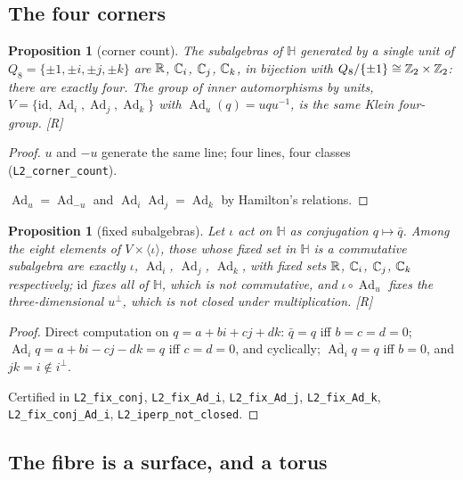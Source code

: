 \documentclass[11pt,a4paper]{article}
\theoremstyle{plain}
\newtheorem{proposition}[theorem]{Proposition}
\theoremstyle{definition}
\theoremstyle{remark}
\newcommand{\Hquat}{\mathbb{H}}
\newcommand{\Ad}{\operatorname{Ad}}
\newcommand{\rigR}{[\textup{R}]}
\begin{document}
\subsection{The four corners}

\begin{proposition}[corner count]\label{prop:corners}
The subalgebras of $\Hquat$ generated by a single unit of $Q_{8}=\{\pm1,\pm i,\pm j,\pm k\}$ are $\mathbb{R}$, $\mathbb{C}_{i}$, $\mathbb{C}_{j}$, $\mathbb{C}_{k}$, in bijection with $Q_{8}/\{\pm1\}\cong\mathbb{Z}_{2}\times\mathbb{Z}_{2}$: there are exactly four. The group of inner automorphisms by units, $V=\{\mathrm{id},\Ad_{i},\Ad_{j},\Ad_{k}\}$ with $\Ad_{u}(q)=uqu^{-1}$, is the same Klein four-group. \rigR
\end{proposition}

\begin{proof}
$u$ and $-u$ generate the same line; four lines, four classes (\texttt{L2\_corner\_count}).

$\Ad_{u}=\Ad_{-u}$ and $\Ad_{i}\Ad_{j}=\Ad_{k}$ by Hamilton's relations.
\end{proof}

\begin{proposition}[fixed subalgebras]\label{prop:fixed}
Let $\iota$ act on $\Hquat$ as conjugation $q\mapsto\bar q$. Among the eight elements of $V\times\langle\iota\rangle$, those whose fixed set in $\Hquat$ is a commutative subalgebra are exactly $\iota$, $\Ad_{i}$, $\Ad_{j}$, $\Ad_{k}$, with fixed sets $\mathbb{R}$, $\mathbb{C}_{i}$, $\mathbb{C}_{j}$, $\mathbb{C}_{k}$ respectively; $\mathrm{id}$ fixes all of $\Hquat$, which is not commutative, and $\iota\circ\Ad_{u}$ fixes the three-dimensional $u^{\perp}$, which is not closed under multiplication. \rigR
\end{proposition}

\begin{proof}
Direct computation on $q=a+bi+cj+dk$: $\bar q=q$ iff $b=c=d=0$; $\Ad_{i}q=a+bi-cj-dk=q$ iff $c=d=0$, and cyclically; $\overline{\Ad_{i}q}=q$ iff $b=0$, and $jk=i\notin i^{\perp}$.

Certified in \texttt{L2\_fix\_conj}, \texttt{L2\_fix\_Ad\_i}, \texttt{L2\_fix\_Ad\_j}, \texttt{L2\_fix\_Ad\_k}, \texttt{L2\_fix\_conj\_Ad\_i}, \texttt{L2\_iperp\_not\_closed}.
\end{proof}

\subsection{The fibre is a surface, and a torus}
\end{document}
